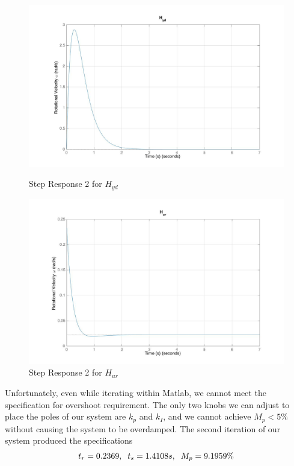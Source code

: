 \documentclass[11pt,titlepage]{article}
\begin{document}
    \begin{figure}[H]
        \centering
        \begin{minipage}{.5\textwidth}
            \centering
            \includegraphics[scale=.18]{Hyd_step2_mat}
            \caption{Step Response 2 for $H_{yd}$}
            \label{fig:Hyd_step2_mat}
        \end{minipage}%
        \begin{minipage}{.5\textwidth}
            \centering
            \includegraphics[scale=.18]{Hur_step2_mat}
            \caption{Step Response 2 for $H_{ur}$}
            \label{fig:Hur_step2_mat}
        \end{minipage}%
    \end{figure}
	
	Unfortunately, even while iterating within Matlab, we cannot meet the specification for overshoot requirement. The only two knobs we can adjust to place the poles of our system are $k_p$ and $k_I$, and we cannot achieve $M_p<5\%$ without causing the system to be overdamped. The second iteration of our system produced the specifications 
	\begin{align*}
		t_r = 0.2369,\hspace{0.2cm} t_s=1.4108 s, \hspace{0.2cm} M_p=9.1959\%
	\end{align*}
	
\end{document}

